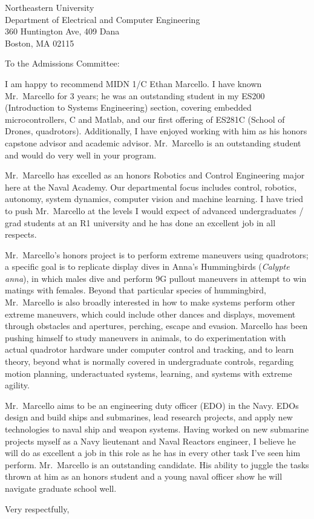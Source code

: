 \documentclass[11pt]{wrceletter}
\date{\today}
\begin{document}
\begin{letter}{%
Northeastern University\\
Department of Electrical and Computer Engineering\\
360 Huntington Ave, 409 Dana\\
Boston, MA 02115}

\opening{To the Admissions Committee:}
\raggedright %
\setlength{\parindent}{15pt} %

I am happy to recommend MIDN 1/C Ethan Marcello. I have known Mr.~Marcello for 3 years; he was an outstanding student in my ES200 (Introduction to Systems Engineering) section, covering embedded microcontrollers, C and Matlab, and our first offering of ES281C (School of Drones, quadrotors). Additionally, I have enjoyed working with him as his honors capstone advisor and academic advisor. Mr.~Marcello is an outstanding student and would do very well in your program. 

Mr.~Marcello has excelled as an honors Robotics and Control Engineering major here at the Naval Academy. Our departmental focus includes control, robotics, autonomy, system dynamics, computer vision and machine learning.  I have tried to push Mr.~Marcello at the levels I would expect of advanced undergraduates / grad students at an R1 university and he has done an excellent job in all respects. 

Mr.~Marcello's honors project is to perform extreme maneuvers using quadrotors; a specific goal is to replicate display dives in Anna's Hummingbirds (\emph{Calypte anna}), in which males dive and perform 9G pullout maneuvers in attempt to win matings with females. Beyond that particular species of hummingbird, Mr.~Marcello is also broadly interested in how to make systems perform other extreme maneuvers, which could include other dances and displays, movement through obstacles and apertures, perching, escape and evasion. Marcello has been pushing himself to study maneuvers in animals, to do experimentation with actual quadrotor hardware under computer control and tracking, and to learn theory, beyond what is normally covered in undergraduate controls, regarding motion planning, underactuated systems, learning, and systems with extreme agility. 

Mr.~Marcello aims to be an engineering duty officer (EDO) in the Navy. EDOs design and build ships and submarines, lead research projects, and apply new technologies to naval ship and weapon systems. Having worked on new submarine projects myself as a Navy lieutenant and Naval Reactors engineer, I believe he will do as excellent a job in this role as he has in every other task I've seen him perform. Mr.~Marcello is an outstanding candidate. His ability to juggle the tasks thrown at him as an honors student and a young naval officer show he will navigate graduate school well. 

\closing{Very respectfully,} %

\end{letter}
\end{document}
